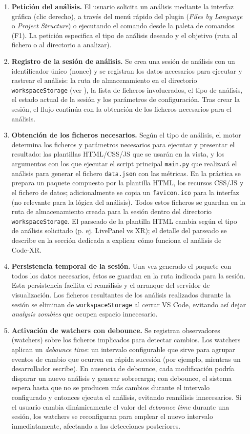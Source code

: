 \documentclass[a4paper, 12pt]{book}
\begin{document}
\begin{enumerate}
  \item \textbf{Petición del análisis.} El usuario solicita un análisis mediante la interfaz gráfica (clic derecho), a través del menú rápido del plugin (\emph{Files by Language} o \emph{Project Structure}) o ejecutando el comando desde la paleta de comandos (F1). La petición especifica el tipo de análisis deseado y el objetivo (ruta al fichero o al directorio a analizar).
  \item \textbf{Registro de la sesión de análisis.} Se crea una sesión de análisis con un identificador único (nonce) y se registran los datos necesarios para ejecutar y rastrear el análisis: la ruta de almacenamiento en el directorio \texttt{workspaceStorage} (ver \cite{vscode-storage}), la lista de ficheros involucrados, el tipo de análisis, el estado actual de la sesión y los parámetros de configuración. Tras crear la sesión, el flujo continúa con la obtención de los ficheros necesarios para el análisis.
  \item \textbf{Obtención de los ficheros necesarios.} Según el tipo de análisis, el motor determina los ficheros y parámetros necesarios para ejecutar y presentar el resultado: las plantillas HTML/CSS/JS que se usarán en la vista, y los argumentos con los que ejecutar el script principal \texttt{main.py} que realizará el análisis para generar el fichero \texttt{data.json} con las métricas. En la práctica se prepara un paquete compuesto por la plantilla HTML, los recursos CSS/JS y el fichero de datos; adicionalmente se copia un \texttt{favicon.ico} para la interfaz (no relevante para la lógica del análisis). Todos estos ficheros se guardan en la ruta de almacenamiento creada para la sesión dentro del directorio \texttt{workspaceStorage}. El parseado de la plantilla HTML cambia según el tipo de análisis solicitado (p. ej. LivePanel vs XR); el detalle del parseado se describe en la sección dedicada a explicar cómo funciona el análisis de Code‑XR.
  \item \textbf{Persistencia temporal de la sesión.} Una vez generado el paquete con todos los datos necesarios, éstos se guardan en la ruta indicada para la sesión. Esta persistencia facilita el re\-análisis y el arranque del servidor de visualización. Los ficheros resultantes de los análisis realizados durante la sesión se eliminan de \texttt{workspaceStorage} al cerrar VS Code, evitando así dejar \emph{analysis zombies} que ocupen espacio innecesario.
  \item \textbf{Activación de watchers con debounce.} Se registran observadores (watchers) sobre los ficheros implicados para detectar cambios. Los watchers aplican un \emph{debounce time}: un intervalo configurable que sirve para agrupar eventos de cambio que ocurren en rápida sucesión (por ejemplo, mientras un desarrollador escribe). En ausencia de debounce, cada modificación podría disparar un nuevo análisis y generar sobrecarga; con debounce, el sistema espera hasta que no se producen más cambios durante el intervalo configurado y entonces ejecuta el análisis, evitando re\-análisis innecesarios. Si el usuario cambia dinámicamente el valor del \emph{debounce time} durante una sesión, los watchers se reconfiguran para emplear el nuevo intervalo inmediatamente, afectando a las detecciones posteriores.

\end{enumerate}
\end{document}
